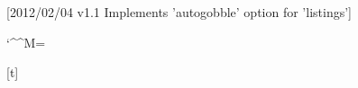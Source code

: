 [2012/02/04 v1.1 Implements 'autogobble' option 
for 'listings']

\RequirePackage{listings}

\newcount\lstag@spacecount

\def\lstag@activespace{\lst@ProcessSpace}%
\def\lstag@tabulator{\lst@ProcessTabulator}%

\begingroup
\catcode`\^^M=\active%
\gdef\lstag@activenl{^^M}%
\endgroup


[t]{\lst@ifautogobble}



\def\lst@autogobble{%
    \lst@ifautogobble
        \ifnum\lst@gobble>0\else
            \def\lst@gobble{\lstag@gobble}%
            \def\lstag@gobble{0}%
            \lstag@spacecount\z@
            \def\lstag@spaceaccu{}%
            \let\lstag@restofline\empty
            \let\lstag@origlstenv@Process\lstenv@Process
            \let\lstenv@Process\lstag@countleadingspaces
        \fi
    \fi
}

\def\lstag@countleadingspaces#1{%
    \expandafter\ifx\lstag@activenl#1\relax
        \expandafter\lstag@countleadingspaces@
    \else
        \def\lstag@restofline{Dummy replacement of text after begin of listing 
        to trigger original warning message}%
        \expandafter\lstag@countleadingspaces
    \fi
}

